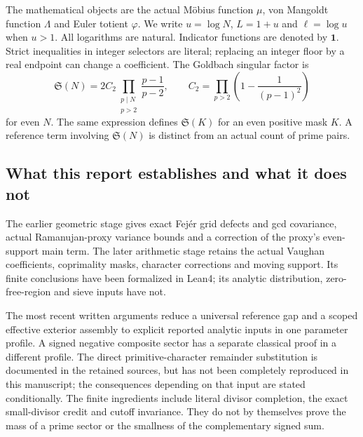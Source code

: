 \documentclass[11pt,a4paper]{article}
\theoremstyle{definition}
\theoremstyle{remark}
\newcommand{\ind}{\mathbf1}
\newcommand{\Sing}{\mathfrak S}
\begin{document}
The mathematical objects are the actual M\"obius function $\mu$, von Mangoldt function $\Lambda$ and Euler totient $\varphi$. We write $u=\log N$, $L=1+u$ and $\ell=\log u$ when $u>1$. All logarithms are natural. Indicator functions are denoted by $\ind$. Strict inequalities in integer selectors are literal; replacing an integer floor by a real endpoint can change a coefficient. The Goldbach singular factor is
\begin{equation}\label{eq:singular-definition}
 \Sing(N)=2C_2\prod_{\substack{p\mid N\\p>2}}\frac{p-1}{p-2},\qquad
 C_2=\prod_{p>2}\left(1-\frac1{(p-1)^2}\right)
\end{equation}
for even $N$. The same expression defines $\Sing(K)$ for an even positive mask $K$. A reference term involving $\Sing(N)$ is distinct from an actual count of prime pairs.

\subsection{What this report establishes and what it does not}
The earlier geometric stage gives exact Fej\'er grid defects and gcd covariance, actual Ramanujan-proxy variance bounds and a correction of the proxy's even-support main term. The later arithmetic stage retains the actual Vaughan coefficients, coprimality masks, character corrections and moving support. Its finite conclusions have been formalized in Lean4; its analytic distribution, zero-free-region and sieve inputs have not.

The most recent written arguments reduce a universal reference gap and a scoped effective exterior assembly to explicit reported analytic inputs in one parameter profile. A signed negative composite sector has a separate classical proof in a different profile. The direct primitive-character remainder substitution is documented in the retained sources, but has not been completely reproduced in this manuscript; the consequences depending on that input are stated conditionally. The finite ingredients include literal divisor completion, the exact small-divisor credit and cutoff invariance. They do not by themselves prove the mass of a prime sector or the smallness of the complementary signed sum.
\end{document}
